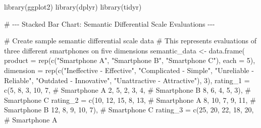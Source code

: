 \documentclass[
  letterpaper,
  DIV=11,
  numbers=noendperiod]{scrartcl}
\newenvironment{Shaded}{\begin{snugshade}}{\end{snugshade}}
\newcommand{\AttributeTok}[1]{\textcolor[rgb]{0.40,0.45,0.13}{#1}}
\newcommand{\CommentTok}[1]{\textcolor[rgb]{0.37,0.37,0.37}{#1}}
\newcommand{\DecValTok}[1]{\textcolor[rgb]{0.68,0.00,0.00}{#1}}
\newcommand{\FunctionTok}[1]{\textcolor[rgb]{0.28,0.35,0.67}{#1}}
\newcommand{\NormalTok}[1]{\textcolor[rgb]{0.00,0.23,0.31}{#1}}
\newcommand{\OtherTok}[1]{\textcolor[rgb]{0.00,0.23,0.31}{#1}}
\newcommand{\StringTok}[1]{\textcolor[rgb]{0.13,0.47,0.30}{#1}}
\begin{document}
\begin{Shaded}
\begin{Highlighting}[]
\FunctionTok{library}\NormalTok{(ggplot2)}
\FunctionTok{library}\NormalTok{(dplyr)}
\FunctionTok{library}\NormalTok{(tidyr)}

\CommentTok{\# {-}{-}{-} Stacked Bar Chart: Semantic Differential Scale Evaluations {-}{-}{-}}

\CommentTok{\# Create sample semantic differential scale data}
\CommentTok{\# This represents evaluations of three different smartphones on five dimensions}
\NormalTok{semantic\_data }\OtherTok{\textless{}{-}} \FunctionTok{data.frame}\NormalTok{(}
  \AttributeTok{product =} \FunctionTok{rep}\NormalTok{(}\FunctionTok{c}\NormalTok{(}\StringTok{"Smartphone A"}\NormalTok{, }\StringTok{"Smartphone B"}\NormalTok{, }\StringTok{"Smartphone C"}\NormalTok{), }\AttributeTok{each =} \DecValTok{5}\NormalTok{),}
  \AttributeTok{dimension =} \FunctionTok{rep}\NormalTok{(}\FunctionTok{c}\NormalTok{(}\StringTok{"Ineffective {-} Effective"}\NormalTok{,}
                    \StringTok{"Complicated {-} Simple"}\NormalTok{,}
                    \StringTok{"Unreliable {-} Reliable"}\NormalTok{,}
                    \StringTok{"Outdated {-} Innovative"}\NormalTok{,}
                    \StringTok{"Unattractive {-} Attractive"}\NormalTok{), }\DecValTok{3}\NormalTok{),}
  \AttributeTok{rating\_1 =} \FunctionTok{c}\NormalTok{(}\DecValTok{5}\NormalTok{, }\DecValTok{8}\NormalTok{, }\DecValTok{3}\NormalTok{, }\DecValTok{10}\NormalTok{, }\DecValTok{7}\NormalTok{,       }\CommentTok{\# Smartphone A}
               \DecValTok{2}\NormalTok{, }\DecValTok{5}\NormalTok{, }\DecValTok{2}\NormalTok{, }\DecValTok{3}\NormalTok{, }\DecValTok{4}\NormalTok{,        }\CommentTok{\# Smartphone B}
               \DecValTok{8}\NormalTok{, }\DecValTok{6}\NormalTok{, }\DecValTok{4}\NormalTok{, }\DecValTok{5}\NormalTok{, }\DecValTok{3}\NormalTok{),       }\CommentTok{\# Smartphone C}
  \AttributeTok{rating\_2 =} \FunctionTok{c}\NormalTok{(}\DecValTok{10}\NormalTok{, }\DecValTok{12}\NormalTok{, }\DecValTok{15}\NormalTok{, }\DecValTok{8}\NormalTok{, }\DecValTok{13}\NormalTok{,    }\CommentTok{\# Smartphone A}
               \DecValTok{8}\NormalTok{, }\DecValTok{10}\NormalTok{, }\DecValTok{7}\NormalTok{, }\DecValTok{9}\NormalTok{, }\DecValTok{11}\NormalTok{,      }\CommentTok{\# Smartphone B}
               \DecValTok{12}\NormalTok{, }\DecValTok{8}\NormalTok{, }\DecValTok{9}\NormalTok{, }\DecValTok{10}\NormalTok{, }\DecValTok{7}\NormalTok{),     }\CommentTok{\# Smartphone C}
  \AttributeTok{rating\_3 =} \FunctionTok{c}\NormalTok{(}\DecValTok{25}\NormalTok{, }\DecValTok{20}\NormalTok{, }\DecValTok{22}\NormalTok{, }\DecValTok{18}\NormalTok{, }\DecValTok{20}\NormalTok{,   }\CommentTok{\# Smartphone A}

\end{Highlighting}
\end{Shaded}
\end{document}
